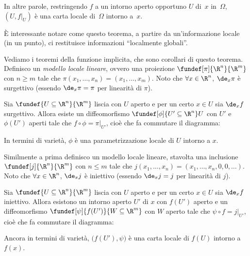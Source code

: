 In altre parole,
restringendo $f$ a un intorno aperto opportuno $U$ di~$x$ in~$\Omega$,
$(U,f|_U)$ è una carta locale di~$\Omega$ intorno a~$x$.

È interessante notare come questo teorema,
a partire da un'informazione locale (in un punto),
ci restituisce informazioni ``localmente globali''.

Vediamo i teoremi della funzione implicita,
che sono corollari di questo teorema.
Definisco un \emph{modello locale lineare},
ovvero una proiezione $\fundef[\pi]{\R^n}{\R^m}$ con $n \ge m$
tale che $\pi(x_1,\dots,x_n)=(x_1,\dots,x_m)$.
Noto che $\forall x \in \R^n$, $\de_x\pi$ è surgettivo
(essendo $\de_x\pi=\pi$ per linearità di $\pi$).

\begin{fat}
	\label{th:funimpsurg}
	Sia $\fundef{U\subseteq\R^n}{\R^m}$ liscia con $U$ aperto
	e per un certo $x\in U$ sia $\de_xf$ surgettivo.
	Allora esiste un diffeomorfismo $\fundef[\phi]{U'\subseteq\R^n}U$
	con $U'$ e $\phi(U')$ aperti
	tale che $f\circ\phi=\pi|_{U'}$, cioè che fa commutare il diagramma:
	\begin{center}
		
	\end{center}
\end{fat}

In termini di varietà, $\phi$ è una parametrizzazione locale di $U$ intorno a $x$.

Similmente a prima definisco un modello locale lineare,
stavolta una inclusione $\fundef[j]{\R^n}{\R^m}$ con $n \le m$
tale che $j(x_1,\dots,x_n)=(x_1,\dots,x_n,0,0,\dots)$.
Noto che $\forall x \in \R^n$, $\de_xj$ è iniettivo
(essendo $\de_xj=j$ per linearità di $j$).

\begin{fat}
	\label{th:funimpinj}
	Sia $\fundef{U\subseteq\R^n}{\R^m}$ liscia con $U$ aperto
	e per un certo $x\in U$ sia $\de_xf$ iniettivo.
	Allora esistono un intorno aperto $U'$ di $x$ con $f(U')$ aperto
	e un diffeomorfismo $\fundef[\psi]{f(U')}{W\subseteq\R^m}$ con $W$ aperto
	tale che $\psi\circ f=j|_{U'}$, cioè che fa commutare il diagramma:
	\begin{center}
		
	\end{center}
\end{fat}

Ancora in termini di varietà, $\big(f(U'),\psi\big)$ è una carta locale di $f(U)$ intorno a~$f(x)$.

